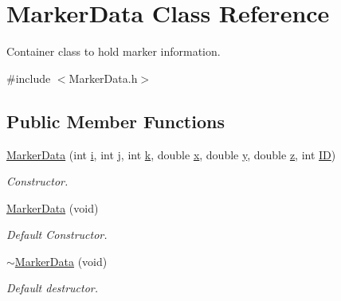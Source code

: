 \hypertarget{class_marker_data}{}\section{Marker\+Data Class Reference}
\label{class_marker_data}


Container class to hold marker information.  




{\ttfamily \#include $<$Marker\+Data.\+h$>$}

\subsection*{Public Member Functions}
\begin{DoxyCompactItemize}
\item 
\hyperlink{class_marker_data_a6893b09af012bdf7ab510f8b491ca40e}{Marker\+Data} (int \hyperlink{class_marker_data_abb9f15d2132f7007cf0612d53cd969db}{i}, int \hyperlink{class_marker_data_ae48473a1571656cf8f02403cb42a4adc}{j}, int \hyperlink{class_marker_data_a66183b4e9a166279551f4c180d0d71c8}{k}, double \hyperlink{class_marker_data_aade1e2f618efa75989831f028db027cd}{x}, double \hyperlink{class_marker_data_a9b10ce07e886a94fc10e097b2cef2265}{y}, double \hyperlink{class_marker_data_adc00ff164746747a7b379a94abf8a2df}{z}, int \hyperlink{class_marker_data_aae16e1f3245f8ef95ed6170e3775669d}{ID})
\begin{DoxyCompactList}\small\item\em Constructor. \end{DoxyCompactList}\item 
\hyperlink{class_marker_data_a9314e10d84afacc7c6eb6e1fec9c8cf7}{Marker\+Data} (void)
\begin{DoxyCompactList}\small\item\em Default Constructor. \end{DoxyCompactList}\item 
\hyperlink{class_marker_data_aa2f67eda451a48ab5cc4162e12b675e0}{$\sim$\+Marker\+Data} (void)
\begin{DoxyCompactList}\small\item\em Default destructor. \end{DoxyCompactList}\end{DoxyCompactItemize}
